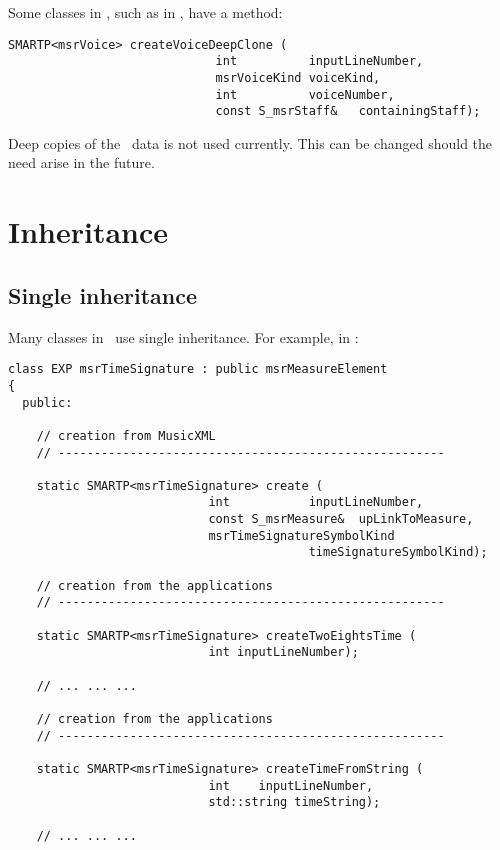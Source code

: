 Some classes in \mf, such as  in , have a  method:
\begin{lstlisting}[language=CPlusPlus]
     SMARTP<msrVoice> createVoiceDeepClone (
                             int          inputLineNumber,
                             msrVoiceKind voiceKind,
                             int          voiceNumber,
                             const S_msrStaff&   containingStaff);
\end{lstlisting}

Deep copies of the \msrRepr\ data is not used currently. This can be changed should the need arise in the future.


\section{Inheritance}

\subsection{Single inheritance}

Many classes in \mf\ use single inheritance. For example, in :
\begin{lstlisting}[language=CPlusPlus]
class EXP msrTimeSignature : public msrMeasureElement
{
  public:

    // creation from MusicXML
    // ------------------------------------------------------

    static SMARTP<msrTimeSignature> create (
                            int           inputLineNumber,
                            const S_msrMeasure&  upLinkToMeasure,
                            msrTimeSignatureSymbolKind
                                          timeSignatureSymbolKind);

    // creation from the applications
    // ------------------------------------------------------

    static SMARTP<msrTimeSignature> createTwoEightsTime (
                            int inputLineNumber);

    // ... ... ...

    // creation from the applications
    // ------------------------------------------------------

    static SMARTP<msrTimeSignature> createTimeFromString (
                            int    inputLineNumber,
                            std::string timeString);

    // ... ... ...
\end{lstlisting}


